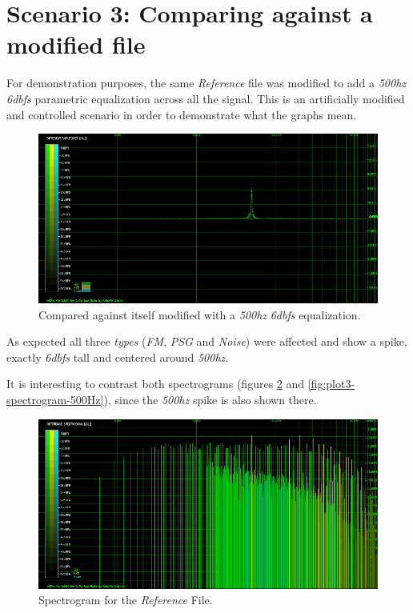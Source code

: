 \documentclass[10pt,a4paper]{report}
\newcommand{\hz}[1]{\textit{#1\acrshort{hz}}}
\newcommand{\db}[1]{\textit{#1\acrshort{dbfs}}}
\begin{document}
\section{Scenario 3: Comparing against a modified file}
\label{scenario3}

For demonstration purposes, the same \textit{Reference} file was modified to add a \hz{500} \db{6} parametric equalization across all the signal. This is an artificially modified and controlled scenario in order to demonstrate what the graphs mean.

\begin{figure}[H]
	\centering
	\includegraphics[width=1.0\linewidth]{images/interpretation/Plot3-Modified.png}
	\caption[1kHz modified]{Compared against itself modified with a \hz{500} \db{6} equalization.}
	\label{fig:plot3-modified}
\end{figure}

As expected all three \textit{types} (\textit{FM}, \textit{PSG} and \textit{Noise}) were affected and show a spike, exactly \db{6} tall and centered around \hz{500}.

It is interesting to contrast both spectrograms (figures \ref{fig:plot3-spectrogram} and \ref{fig:plot3-spectrogram-500Hz}), since the \hz{500} spike is also shown there.

\begin{figure}[H]
	\centering
	\includegraphics[width=1.0\linewidth]{images/interpretation/Plot3-Spectrogram.png}
	\caption[Reference File]{Spectrogram for the \textit{Reference} File.}
	\label{fig:plot3-spectrogram}
\end{figure}
\end{document}
